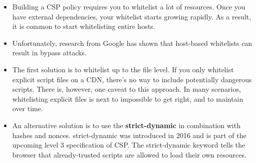 \documentclass[../main.tex]{subfiles}
\begin{document}
\begin{itemize}
\item Building a CSP policy requires you to whitelist a lot of resources. Once you have external dependencies, your whitelist starts growing rapidly. As a result, it is common to start whitelisting entire hosts.
\item Unfortunately, research from Google has shown that host-based whitelists can result in bypass attacks.
\item The first solution is to whitelist up to the file level. If you only whitelist explicit script files on a CDN, there’s no way to include potentially dangerous scripts. There is, however, one caveat to this approach. In many scenarios, whitelisting explicit files is next to impossible to get right, and to maintain over time.
\item An alternative solution is to use the \textbf{strict-dynamic} in combination with hashes and nonces. strict-dynamic was introduced in 2016 and is part of the upcoming level 3 specification of CSP. The strict-dynamic keyword tells the browser that already-trusted scripts are allowed to load their own resources.
\end{itemize}
\end{document}
